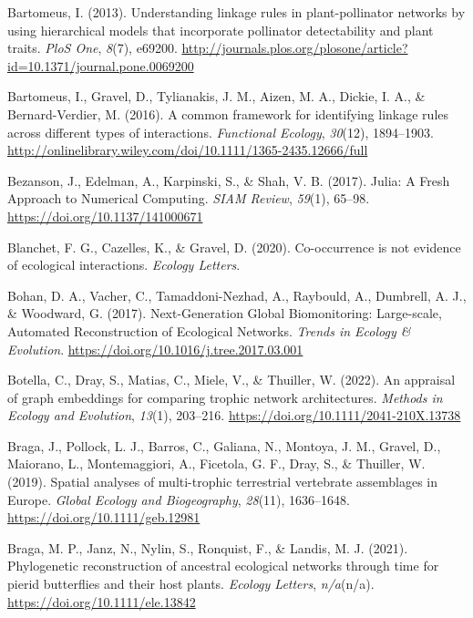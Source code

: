 \documentclass[11pt]{article}
\newlength{\cslhangindent}
\newenvironment{CSLReferences}[2] %
 {%
  \setlength{\parindent}{0pt}
  \ifodd #1 \everypar{\setlength{\hangindent}{\cslhangindent}}\ignorespaces\fi
  \ifnum #2 > 0
  \setlength{\parskip}{#2\baselineskip}
  \fi
 }%
 {}
\begin{document}
\begin{CSLReferences}{1}{0}
\leavevmode{}%
Bartomeus, I. (2013). Understanding linkage rules in plant-pollinator
networks by using hierarchical models that incorporate pollinator
detectability and plant traits. \emph{PloS One}, \emph{8}(7), e69200.
\url{http://journals.plos.org/plosone/article?id=10.1371/journal.pone.0069200}

\leavevmode{}%
Bartomeus, I., Gravel, D., Tylianakis, J. M., Aizen, M. A., Dickie, I.
A., \& Bernard-Verdier, M. (2016). A common framework for identifying
linkage rules across different types of interactions. \emph{Functional
Ecology}, \emph{30}(12), 1894--1903.
\url{http://onlinelibrary.wiley.com/doi/10.1111/1365-2435.12666/full}

\leavevmode{}%
Bezanson, J., Edelman, A., Karpinski, S., \& Shah, V. B. (2017). Julia:
A Fresh Approach to Numerical Computing. \emph{SIAM Review},
\emph{59}(1), 65--98. \url{https://doi.org/10.1137/141000671}

\leavevmode{}%
Blanchet, F. G., Cazelles, K., \& Gravel, D. (2020). Co-occurrence is
not evidence of ecological interactions. \emph{Ecology Letters}.

\leavevmode{}%
Bohan, D. A., Vacher, C., Tamaddoni-Nezhad, A., Raybould, A., Dumbrell,
A. J., \& Woodward, G. (2017). Next-Generation Global Biomonitoring:
Large-scale, Automated Reconstruction of Ecological Networks.
\emph{Trends in Ecology \& Evolution}.
\url{https://doi.org/10.1016/j.tree.2017.03.001}

\leavevmode{}%
Botella, C., Dray, S., Matias, C., Miele, V., \& Thuiller, W. (2022). An
appraisal of graph embeddings for comparing trophic network
architectures. \emph{Methods in Ecology and Evolution}, \emph{13}(1),
203--216. \url{https://doi.org/10.1111/2041-210X.13738}

\leavevmode{}%
Braga, J., Pollock, L. J., Barros, C., Galiana, N., Montoya, J. M.,
Gravel, D., Maiorano, L., Montemaggiori, A., Ficetola, G. F., Dray, S.,
\& Thuiller, W. (2019). Spatial analyses of multi-trophic terrestrial
vertebrate assemblages in Europe. \emph{Global Ecology and
Biogeography}, \emph{28}(11), 1636--1648.
\url{https://doi.org/10.1111/geb.12981}

\leavevmode{}%
Braga, M. P., Janz, N., Nylin, S., Ronquist, F., \& Landis, M. J.
(2021). Phylogenetic reconstruction of ancestral ecological networks
through time for pierid butterflies and their host plants. \emph{Ecology
Letters}, \emph{n/a}(n/a). \url{https://doi.org/10.1111/ele.13842}


\end{CSLReferences}
\end{document}
